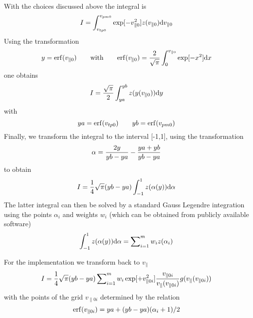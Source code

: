 With the choices discussed above the integral is 
\begin{equation}
I = \int\nolimits_{v_{tp0}}^{v_{pm0}} \exp [ - v_{\parallel 0}^2 ] z(v_{\parallel 0}) {\rm d} v_{\parallel 0} 
\end{equation} 
Using the transformation 
\begin{equation} 
y = {\rm erf} (v_{\parallel 0}) \qquad {\rm with}\qquad {\rm erf}(v_{\parallel 0} ) = {2 \over \sqrt{\pi}} 
\int_0^{v_{\parallel 0}} \exp [-x^2] {\rm d} x
\end{equation} 
one obtains 
\begin{equation} 
I = {\sqrt\pi \over 2 } \int\nolimits_{ya}^{yb} z(y(v_{\parallel 0})) {\rm d} y 
\end{equation} 
with 
\begin{equation} 
ya = {\rm erf}(v_{tp0}) \qquad yb = {\rm erf}(v_{pm0} ) 
\end{equation} 
Finally, we transform the integral to the interval [-1,1], using the transformation 
\begin{equation} 
\alpha = {2 y \over yb - ya} - {ya + yb \over yb - ya} 
\end{equation} 
to obtain 
\begin{equation} 
I = {1\over 4} \sqrt\pi (yb - ya) \int_{-1}^1 z(\alpha(y)) {\rm d} \alpha 
\end{equation} 
The latter integral can then be solved by a standard Gauss Legendre integration using the points 
$\alpha_i$ and weights $w_i$ (which can be obtained from publicly available software) 
\begin{equation} 
\int_{-1}^1 z(\alpha(y)) {\rm d} \alpha = \sum\nolimits_{i = 1}^m  w_i z(\alpha_i) 
\end{equation} 

For the implementation we transform back to $v_{\parallel}$ 
\begin{equation} 
I = {1 \over 4} \sqrt\pi (yb-ya) \sum\nolimits_{i = 1}^m w_i \exp[ + v_{\parallel 0i}^2] {v_{\parallel 0 i} \over v_\parallel (v_{\parallel 0i} ) } 
g(v_\parallel(v_{\parallel 0i})) 
\end{equation} 
with the points of the grid $v_{\parallel 0 i}$ determined by the relation 
\begin{equation} 
{\rm erf}(v_{\parallel 0 i} ) = ya + (yb - ya)(\alpha_i + 1 )/2 
\end{equation}



